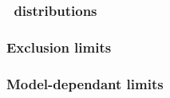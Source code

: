 \begin{frame}
\frametitle{\mTtot\ distributions}


\end{frame}

\begin{frame}
\frametitle{Exclusion limits}

\end{frame}

\begin{frame}
\frametitle{Model-dependant limits}


\end{frame}